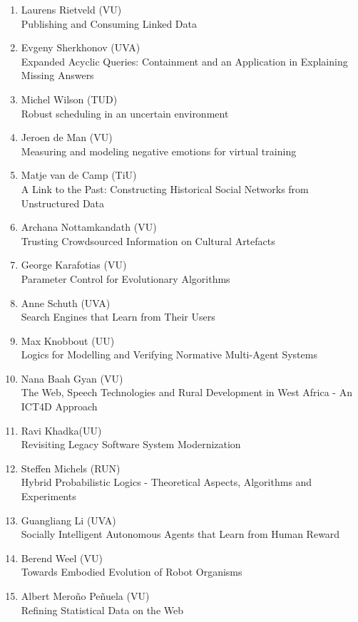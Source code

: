 \begin{multicols}{2}
\begin{scriptsize}
\begin{enumerate}[label=\textbf{2016-\arabic*},leftmargin=0cm,itemindent=1.15cm,labelwidth=\itemindent,labelsep=0cm,align=left,noitemsep]
\item Laurens Rietveld (VU)  \\
	Publishing and Consuming Linked Data
	
\item Evgeny Sherkhonov (UVA)   \\
	Expanded Acyclic Queries: Containment and an Application in Explaining Missing Answers

\item Michel Wilson (TUD)  \\
	Robust scheduling in an uncertain environment 
\item Jeroen de Man (VU)  \\
	Measuring and modeling negative emotions for virtual training
\item Matje van de Camp (TiU)  \\
	A Link to the Past: Constructing Historical Social Networks from Unstructured Data 
\item Archana Nottamkandath (VU)   \\
	Trusting Crowdsourced Information on Cultural Artefacts
\item George Karafotias (VU)  \\
	Parameter Control for Evolutionary Algorithms 
\item Anne Schuth (UVA)   \\
	Search Engines that Learn from Their Users
	
\item Max Knobbout (UU) \\
	Logics for Modelling and Verifying Normative Multi-Agent Systems 
\item Nana Baah Gyan (VU)   \\
	The Web, Speech Technologies and Rural Development in West Africa - An ICT4D Approach 
\item Ravi Khadka(UU)  \\
	Revisiting Legacy Software System Modernization 
\item Steffen Michels (RUN)   \\
	Hybrid Probabilistic Logics - Theoretical Aspects, Algorithms and Experiments
\item Guangliang Li (UVA)  \\
	Socially Intelligent Autonomous Agents that Learn from Human Reward 
\item Berend Weel (VU)   \\
	Towards Embodied Evolution of Robot Organisms
\item Albert Meroño Peñuela (VU)  \\
	Refining Statistical Data on the Web 


\end{enumerate}
\end{scriptsize}
\end{multicols}
